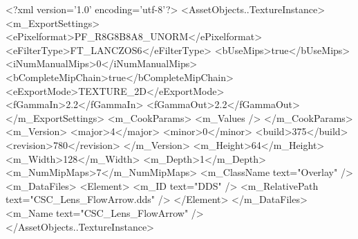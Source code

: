 <?xml version='1.0' encoding='utf-8'?>
<AssetObjects..TextureInstance>
  <m_ExportSettings>
    <ePixelformat>PF_R8G8B8A8_UNORM</ePixelformat>
    <eFilterType>FT_LANCZOS6</eFilterType>
    <bUseMips>true</bUseMips>
    <iNumManualMips>0</iNumManualMips>
    <bCompleteMipChain>true</bCompleteMipChain>
    <eExportMode>TEXTURE_2D</eExportMode>
    <fGammaIn>2.2</fGammaIn>
    <fGammaOut>2.2</fGammaOut>
  </m_ExportSettings>
  <m_CookParams>
    <m_Values />
  </m_CookParams>
  <m_Version>
    <major>4</major>
    <minor>0</minor>
    <build>375</build>
    <revision>780</revision>
  </m_Version>
  <m_Height>64</m_Height>
  <m_Width>128</m_Width>
  <m_Depth>1</m_Depth>
  <m_NumMipMaps>7</m_NumMipMaps>
  <m_ClassName text="Overlay" />
  <m_DataFiles>
    <Element>
      <m_ID text="DDS" />
      <m_RelativePath text="CSC_Lens_FlowArrow.dds" />
    </Element>
  </m_DataFiles>
  <m_Name text="CSC_Lens_FlowArrow" />
</AssetObjects..TextureInstance>
